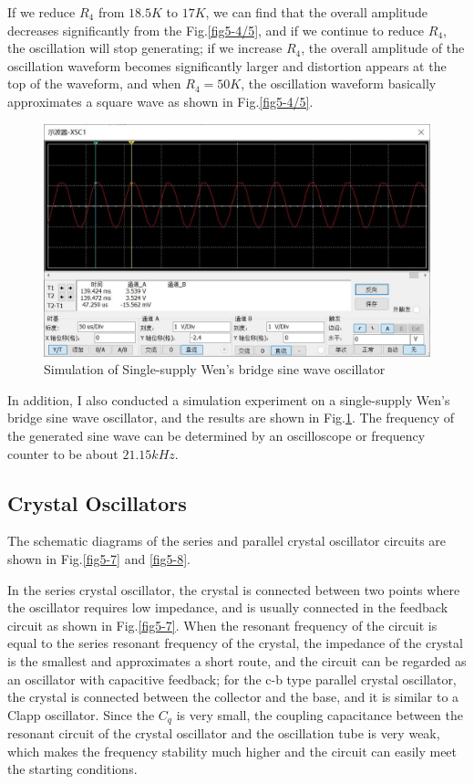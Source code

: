 \documentclass[conference]{IEEEtran}
\begin{document}
If we reduce $R_4$ from $18.5K$ to $17K$, we can find that the overall amplitude decreases significantly from the Fig.\ref{fig5-4/5}, and if we continue to reduce $R_4$, the oscillation will stop generating; if we increase $R_4$, the overall amplitude of the oscillation waveform becomes significantly larger and distortion appears at the top of the waveform, and when $R_4=50K$, the oscillation waveform basically approximates a square wave as shown in Fig.\ref{fig5-4/5}. 

\begin{figure}[!h]
\centerline{\includegraphics[scale=0.25]{fig/pic5-6.jpg}}
\caption{Simulation of Single-supply Wen's bridge sine wave oscillator}
\label{fig5-6}
\end{figure}

In addition, I also conducted a simulation experiment on a single-supply Wen's bridge sine wave oscillator, and the results are shown in Fig.\ref{fig5-6}. The frequency of the generated sine wave can be determined by an oscilloscope or frequency counter to be about $21.15kHz$. 

\subsection{Crystal Oscillators}
The schematic diagrams of the series and parallel crystal oscillator circuits are shown in Fig.\ref{fig5-7} and \ref{fig5-8}. 

In the series crystal oscillator, the crystal is connected between two points where the oscillator requires low impedance, and is usually connected in the feedback circuit as shown in Fig.\ref{fig5-7}. When the resonant frequency of the circuit is equal to the series resonant frequency of the crystal, the impedance of the crystal is the smallest and approximates a short route, and the circuit can be regarded as an oscillator with capacitive feedback; for the c-b type parallel crystal oscillator, the crystal is connected between the collector and the base, and it is similar to a Clapp oscillator. Since the $C_q$ is very small, the coupling capacitance between the resonant circuit of the crystal oscillator and the oscillation tube is very weak, which makes the frequency stability much higher and the circuit can easily meet the starting conditions. 
\end{document}
